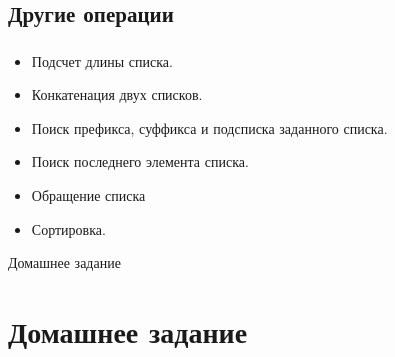 \subsection{Другие операции}

\begin{frame}

	\frametitle{\insertsection}
	\framesubtitle{\insertsubsection}
	
	\begin{itemize}
		\item Подсчет длины списка.
		\item Конкатенация двух списков.
		\item Поиск префикса, суффикса и подсписка заданного списка.
		\item Поиск последнего элемента списка.
		\item Обращение списка
		\item Сортировка.
	\end{itemize}

\end{frame}


\begin{frame}[plain,c]
	
	\begin{center}
		\Huge Домашнее задание
	\end{center}

\end{frame}

\section{Домашнее задание}


